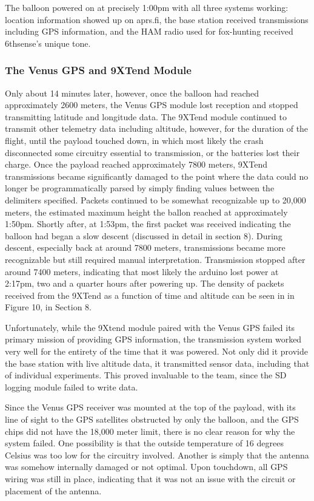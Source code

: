 \documentclass[12pt,]{article}
\begin{document}
The balloon powered on at precisely 1:00pm with all three systems
working: location information showed up on aprs.fi, the base station
received transmissions including GPS information, and the HAM radio used
for fox-hunting received 6thsense's unique tone.

\subsubsection{The Venus GPS and 9XTend
Module}\label{the-venus-gps-and-9xtend-module}

Only about 14 minutes later, however, once the balloon had reached
approximately 2600 meters, the Venus GPS module lost reception and
stopped transmitting latitude and longitude data. The 9XTend module
continued to transmit other telemetry data including altitude, however,
for the duration of the flight, until the payload touched down, in which
most likely the crash disconnected some circuitry essential to
transmission, or the batteries lost their charge. Once the payload
reached approximately 7800 meters, 9XTend transmissions became
significantly damaged to the point where the data could no longer be
programmatically parsed by simply finding values between the delimiters
specified. Packets continued to be somewhat recognizable up to 20,000
meters, the estimated maximum height the ballon reached at approximately
1:50pm. Shortly after, at 1:53pm, the first packet was received
indicating the balloon had began a slow descent (discussed in detail in
section 8). During descent, especially back at around 7800 meters,
transmissions became more recognizable but still required manual
interpretation. Transmission stopped after around 7400 meters,
indicating that most likely the arduino lost power at 2:17pm, two and a
quarter hours after powering up. The density of packets received from
the 9XTend as a function of time and altitude can be seen in in Figure
10, in Section 8.

Unfortunately, while the 9Xtend module paired with the Venus GPS failed
its primary mission of providing GPS information, the transmission
system worked very well for the entirety of the time that it was
powered. Not only did it provide the base station with live altitude
data, it transmitted sensor data, including that of individual
experiments. This proved invaluable to the team, since the SD logging
module failed to write data.

Since the Venus GPS receiver was mounted at the top of the payload, with
its line of sight to the GPS satellites obstructed by only the balloon,
and the GPS chips did not have the 18,000 meter limit, there is no clear
reason for why the system failed. One possibility is that the outside
temperature of 16 degrees Celsius was too low for the circuitry
involved. Another is simply that the antenna was somehow internally
damaged or not optimal. Upon touchdown, all GPS wiring was still in
place, indicating that it was not an issue with the circuit or placement
of the antenna.
\end{document}
